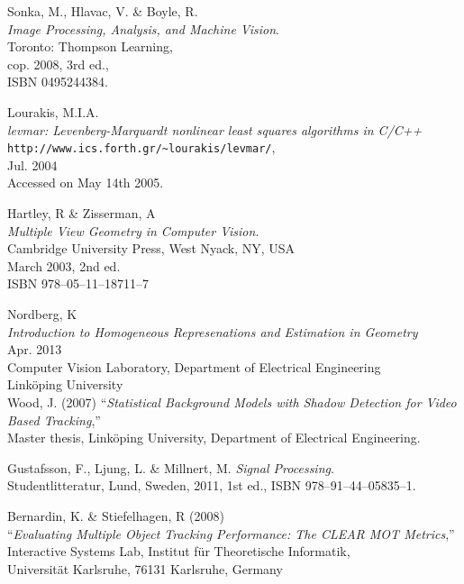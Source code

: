 \begin{thebibliography}{9}

	Sonka, M., Hlavac, V. \& Boyle, R. \\
	\emph{Image Processing, Analysis, and Machine Vision}.\\
	Toronto: Thompson Learning,\\
	cop. 2008, 3rd ed.,\\
	ISBN 0495244384.

    Lourakis, M.I.A.\\
   \emph{levmar: Levenberg-Marquardt nonlinear least squares algorithms in {C}/{C}++}\\
     \verb+http://www.ics.forth.gr/~lourakis/levmar/+,\\
    Jul. 2004\\
    Accessed on May 14th 2005.

	Hartley, R \& Zisserman, A\\
	\emph{Multiple View Geometry in Computer Vision}.\\
	Cambridge University Press, West Nyack, NY, USA \\
	March 2003, 2nd ed.\\
	ISBN 978--05--11--18711--7
	
	Nordberg, K\\
	\emph{Introduction to Homogeneous Represenations and Estimation in Geometry}\\
	Apr. 2013\\
	Computer Vision Laboratory,	Department of Electrical Engineering\\
	Linköping University\\
	
	Wood, J. (2007)
	``\textit{Statistical Background Models with Shadow Detection for Video Based Tracking},''\\
	Master thesis, Linköping University, Department of Electrical Engineering.	


	
	Gustafsson, F., Ljung, L. \& Millnert, M.
	\emph{Signal Processing}.\\
	Studentlitteratur, Lund, Sweden,
	2011, 1st ed.,
	ISBN 978--91--44--05835--1.

	Bernardin, K. \& Stiefelhagen, R (2008)\\
	``\textit{Evaluating Multiple Object Tracking Performance: The CLEAR MOT Metrics},''\\
	Interactive Systems Lab, Institut für Theoretische Informatik,\\
	Universität Karlsruhe, 76131 Karlsruhe, Germany


\end{thebibliography}
